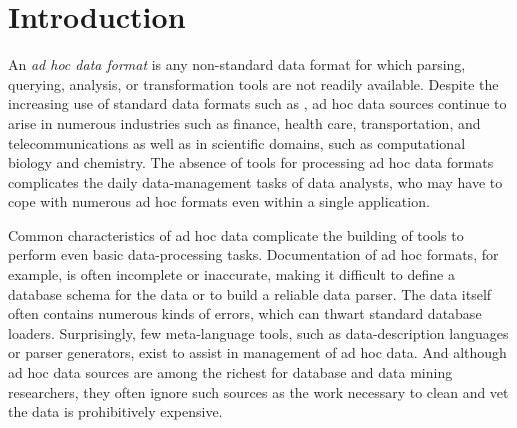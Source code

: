 \section{Introduction}
\label{sec:intro}


An {\em ad hoc data format} is any non-standard data format for which
parsing, querying, analysis, or transformation tools are not readily
available.  Despite the increasing use of standard data formats such
as \xml{}, ad hoc data sources continue to arise in numerous
industries such as finance, health care, transportation, and
telecommunications as well as in scientific domains, such as
computational biology and chemistry.  The absence of tools for
processing ad hoc data formats complicates the daily data-management
tasks of data analysts, who may have to cope with numerous ad
hoc formats even within a single application.  

Common characteristics of ad hoc data complicate the building of tools
to perform even basic data-processing tasks.  Documentation of ad hoc
formats, for example, is often incomplete or inaccurate, making it
difficult to define a database schema for the data or to build a
reliable data parser.  The data itself often contains numerous kinds
of errors, which can thwart standard database loaders.  Surprisingly,
few meta-language tools, such as data-description languages or parser
generators, exist to assist in management of ad hoc data.  And
although ad hoc data sources are among the richest for database and
data mining researchers, they often ignore such sources as the work
necessary to clean and vet the data is prohibitively expensive.




